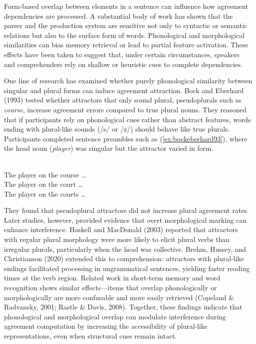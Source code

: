 \documentclass[
  authoryear,
  preprint]{elsarticle}
\begin{document}
Form-based overlap between elements in a sentence can influence how
agreement dependencies are processed. A substantial body of work has
shown that the parser and the production system are sensitive not only
to syntactic or semantic relations but also to the surface form of
words. Phonological and morphological similarities can bias memory
retrieval or lead to partial feature activation. These effects have been
taken to suggest that, under certain circumstances, speakers and
comprehenders rely on shallow or heuristic cues to complete
dependencies.

One line of research has examined whether purely phonological similarity
between singular and plural forms can induce agreement attraction. Bock
and Eberhard (1993) tested whether attractors that only sound plural,
pseudoplurals such as \emph{course}, increase agreement errors compared
to true plural nouns. They reasoned that if participants rely on
phonological cues rather than abstract features, words ending with
plural-like sounds (/s/ or /z/) should behave like true plurals.
Participants completed sentence preambles such as
(\ref{ex:bockeberhard93}), where the head noun (\emph{player}) was
singular but the attractor varied in form.

\ea \label{ex:bockeberhard93}
     \\ The {player} on the {course} \ldots{}
     \\ The {player} on the {court} \ldots{}
     \\ The {player} on the {courts} \ldots{}
    \z
\z

They found that pseudoplural attractors did not increase plural
agreement rates. Later studies, however, provided evidence that overt
morphological marking can enhance interference. Haskell and MacDonald
(2003) reported that attractors with regular plural morphology were more
likely to elicit plural verbs than irregular plurals, particularly when
the head was collective. Brehm, Hussey, and Christianson (2020) extended
this to comprehension: attractors with plural-like endings facilitated
processing in ungrammatical sentences, yielding faster reading times at
the verb region. Related work in short-term memory and word recognition
shows similar effects---items that overlap phonologically or
morphologically are more confusable and more easily retrieved (Copeland
\& Radvansky, 2001; Rastle \& Davis, 2008). Together, these findings
indicate that phonological and morphological overlap can modulate
interference during agreement computation by increasing the
accessibility of plural-like representations, even when structural cues
remain intact.
\end{document}
